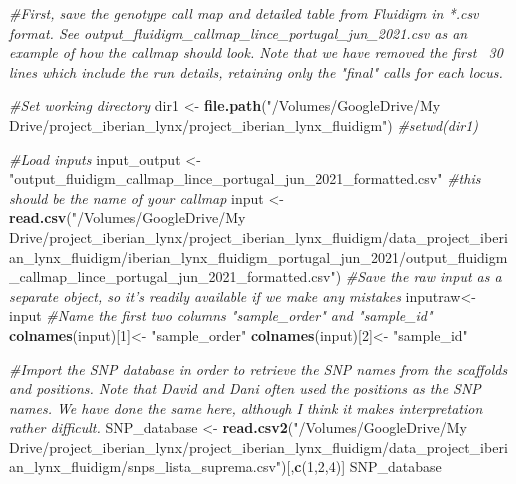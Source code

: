 \documentclass[
]{article}
\newenvironment{Shaded}{\begin{snugshade}}{\end{snugshade}}
\newcommand{\CommentTok}[1]{\textcolor[rgb]{0.56,0.35,0.01}{\textit{#1}}}
\newcommand{\DecValTok}[1]{\textcolor[rgb]{0.00,0.00,0.81}{#1}}
\newcommand{\KeywordTok}[1]{\textcolor[rgb]{0.13,0.29,0.53}{\textbf{#1}}}
\newcommand{\NormalTok}[1]{#1}
\newcommand{\StringTok}[1]{\textcolor[rgb]{0.31,0.60,0.02}{#1}}
\begin{document}
\begin{Shaded}
\begin{Highlighting}[]
\CommentTok{#First, save the genotype call map and detailed table from Fluidigm in *.csv format. See output_fluidigm_callmap_lince_portugal_jun_2021.csv as an example of how the callmap should look. Note that we have removed the first ~30 lines which include the run details, retaining only the "final" calls for each locus.}

\CommentTok{#Set working directory}
\NormalTok{dir1 <-}\StringTok{ }\KeywordTok{file.path}\NormalTok{(}\StringTok{"/Volumes/GoogleDrive/My Drive/project_iberian_lynx/project_iberian_lynx_fluidigm"}\NormalTok{)}
\CommentTok{#setwd(dir1)}

\CommentTok{#Load inputs}
\NormalTok{input_output <-}\StringTok{ "output_fluidigm_callmap_lince_portugal_jun_2021_formatted.csv"} \CommentTok{#this should be the name of your callmap}
\NormalTok{input <-}\StringTok{ }\KeywordTok{read.csv}\NormalTok{(}\StringTok{"/Volumes/GoogleDrive/My Drive/project_iberian_lynx/project_iberian_lynx_fluidigm/data_project_iberian_lynx_fluidigm/iberian_lynx_fluidigm_portugal_jun_2021/output_fluidigm_callmap_lince_portugal_jun_2021_formatted.csv"}\NormalTok{) }
\CommentTok{#Save the raw input as a separate object, so it's readily available if we make any mistakes}
\NormalTok{inputraw<-}\StringTok{ }\NormalTok{input}
\CommentTok{#Name the first two columns "sample_order" and "sample_id"}
\KeywordTok{colnames}\NormalTok{(input)[}\DecValTok{1}\NormalTok{]<-}\StringTok{ "sample_order"}
\KeywordTok{colnames}\NormalTok{(input)[}\DecValTok{2}\NormalTok{]<-}\StringTok{ "sample_id"}

\CommentTok{#Import the SNP database in order to retrieve the SNP names from the scaffolds and positions. Note that David and Dani often used the positions as the SNP names. We have done the same here, although I think it makes interpretation rather difficult.}
\NormalTok{SNP_database <-}\StringTok{ }\KeywordTok{read.csv2}\NormalTok{(}\StringTok{"/Volumes/GoogleDrive/My Drive/project_iberian_lynx/project_iberian_lynx_fluidigm/data_project_iberian_lynx_fluidigm/snps_lista_suprema.csv"}\NormalTok{)[,}\KeywordTok{c}\NormalTok{(}\DecValTok{1}\NormalTok{,}\DecValTok{2}\NormalTok{,}\DecValTok{4}\NormalTok{)]}
\NormalTok{SNP_database}
\end{Highlighting}
\end{Shaded}
\end{document}
